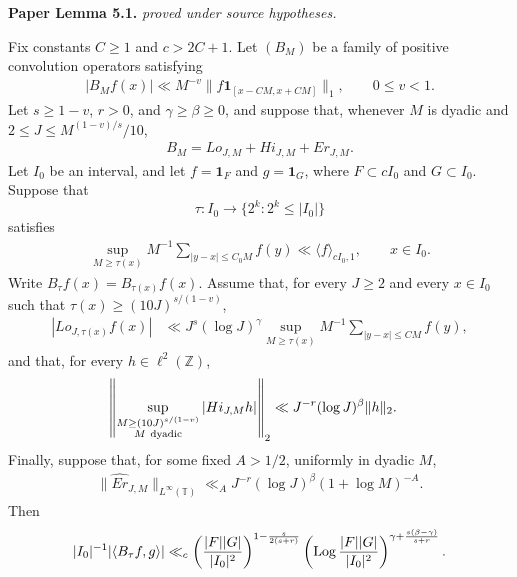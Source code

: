 \begin{lemma}
\label{sparse_recursion}
\leanok
\par\medskip\noindent\textbf{Paper Lemma 5.1.} \textit{proved under source hypotheses.}\par
Fix constants \(C\geq1\) and \(c>2C+1\).  Let \((B_M)\) be a family
of positive convolution operators satisfying
\begin{align}
 |B_M f(x)|
 \ll M^{-v}\|f\mathbf1_{[x-CM,x+CM]}\|_1,
 \qquad 0\leq v<1.
\end{align}
Let \(s\geq1-v\), \(r>0\), and \(\gamma\geq\beta\geq0\), and suppose
that, whenever \(M\) is dyadic and \(2\leq J\leq M^{(1-v)/s}/10\),
\begin{align}
 B_M=Lo_{J,M}+Hi_{J,M}+Er_{J,M}.
\end{align}
Let \(I_0\) be an interval, and let
\(f=\mathbf1_F\) and \(g=\mathbf1_G\), where
\(F\subset cI_0\) and \(G\subset I_0\).  Suppose that
\[
 \tau:I_0\longrightarrow
 \{2^k:2^k\leq|I_0|\}
\]
satisfies
\begin{align}
 \sup_{M\geq\tau(x)}M^{-1}
 \sum_{|y-x|\leq C_0M}f(y)
 \ll \langle f\rangle_{cI_0,1},
 \qquad x\in I_0.
\end{align}
Write \(B_\tau f(x)=B_{\tau(x)}f(x)\).
Assume that, for every \(J\geq2\) and every \(x\in I_0\) such that
\(\tau(x)\geq(10J)^{s/(1-v)}\),
\begin{align}
 |Lo_{J,\tau(x)}f(x)|
 &\ll J^s(\log J)^\gamma
 \sup_{M\geq\tau(x)}M^{-1}
 \sum_{|y-x|\leq CM}f(y),
\end{align}
and that, for every \(h\in\ell^2(\mathbb Z)\),
\begin{align}
 \left\|
 \sup_{\substack{M\geq(10J)^{s/(1-v)}\\M\ {\rm dyadic}}}
 |Hi_{J,M}h|
 \right\|_2
 &\ll J^{-r}(\log J)^\beta\|h\|_2.
\end{align}
Finally, suppose that, for some fixed \(A>1/2\), uniformly in dyadic \(M\),
\begin{align}
 \|\widehat{Er}_{J,M}\|_{L^\infty(\mathbb T)}
 \ll_A
 J^{-r}(\log J)^\beta(1+\log M)^{-A}.
\end{align}
Then
\begin{align}
 |I_0|^{-1}|\langle B_\tau f,g\rangle|
 \ll_c
 \left(\frac{|F||G|}{|I_0|^2}\right)^{
 1-\frac{s}{2(s+r)}}
 \left(\operatorname{Log}\frac{|F||G|}{|I_0|^2}\right)^{
 \gamma+\frac{s(\beta-\gamma)}{s+r}}.
\end{align}

\end{lemma}
